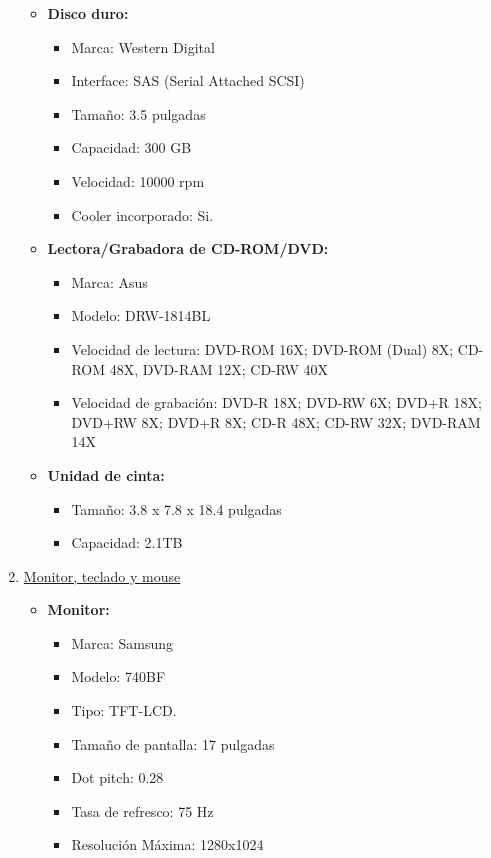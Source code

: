 \begin{enumerate}
\begin{itemize}
    \item \textbf{Disco duro:} %
    \begin{itemize}
      \item Marca: Western Digital
      \item Interface: SAS (Serial Attached SCSI)
      \item Tamaño: 3.5 pulgadas
      \item Capacidad: 300 GB
      \item Velocidad: 10000 rpm
      \item Cooler incorporado: Si.
    \end{itemize}
    
    \item \textbf{Lectora/Grabadora de CD-ROM/DVD:}
    \begin{itemize}
      \item Marca: Asus
      \item Modelo: DRW-1814BL
      \item Velocidad de lectura: DVD-ROM 16X; DVD-ROM (Dual) 8X; CD-ROM 48X, DVD-RAM 12X; CD-RW 40X
      \item Velocidad de grabación: DVD-R 18X; DVD-RW 6X; DVD+R 18X; DVD+RW 8X; DVD+R 8X; CD-R 48X; CD-RW 32X; DVD-RAM 14X
    \end{itemize}
    
    \item \textbf{Unidad de cinta:}
    \begin{itemize}
      \item Tamaño: 3.8 x 7.8 x 18.4 pulgadas
      \item Capacidad: 2.1TB
    \end{itemize}
  \end{itemize}
  
  \item \underline{Monitor, teclado y mouse}
  \begin{itemize}
    \item \textbf{Monitor:}
    \begin{itemize}
      \item Marca: Samsung
      \item Modelo: 740BF
      \item Tipo: TFT-LCD.
      \item Tamaño de pantalla: 17 pulgadas
      \item Dot pitch: 0.28
      \item Tasa de refresco: 75 Hz
      \item Resolución Máxima: 1280x1024
    \end{itemize}
    

\end{itemize}
\end{enumerate}
